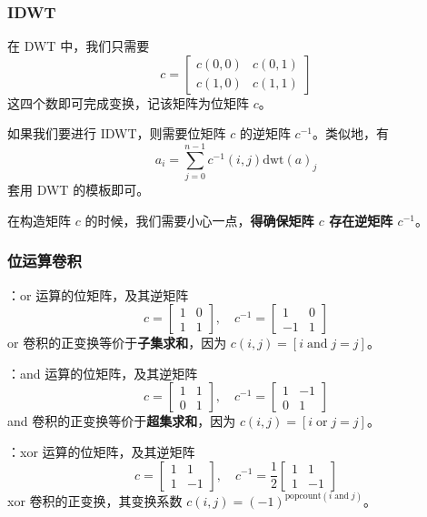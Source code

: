 \subsubsection{IDWT}

在 DWT 中，我们只需要
\[
c = \begin{bmatrix}
c(0, 0) & c(0, 1) \\
c(1, 0) & c(1, 1)
\end{bmatrix}
\]
这四个数即可完成变换，记该矩阵为位矩阵 $c$。

如果我们要进行 IDWT，则需要位矩阵 $c$ 的逆矩阵 $c^{-1}$。类似地，有
\[
a_i = \sum_{j = 0}^{n - 1} c^{-1}(i, j)\mathrm{dwt}(a)_j
\]
套用 DWT 的模板即可。

在构造矩阵 $c$ 的时候，我们需要小心一点，\textbf{得确保矩阵 $c$ 存在逆矩阵 $c^{-1}$}。

\subsubsection{位运算卷积}

：or 运算的位矩阵，及其逆矩阵
\[
c = \begin{bmatrix}
1 & 0 \\
1 & 1
\end{bmatrix}, \quad c^{-1} = \begin{bmatrix}
1 & 0 \\
-1 & 1
\end{bmatrix}
\]
or 卷积的正变换等价于\textbf{子集求和}，因为 $c(i, j) = [i \operatorname{and} j = j]$。

：and 运算的位矩阵，及其逆矩阵
\[
c = \begin{bmatrix}
1 & 1 \\
0 & 1
\end{bmatrix}, \quad c^{-1} = \begin{bmatrix}
1 & -1 \\
0 & 1
\end{bmatrix}
\]
and 卷积的正变换等价于\textbf{超集求和}，因为 $c(i, j) = [i \operatorname{or} j = j]$。

：xor 运算的位矩阵，及其逆矩阵
\[
c = \begin{bmatrix}
1 & 1 \\
1 & -1
\end{bmatrix}, \quad c^{-1} = \frac{1}{2}\begin{bmatrix}
1 & 1 \\
1 & -1
\end{bmatrix}
\]
xor 卷积的正变换，其变换系数 $c(i, j) = (-1)^{\mathrm{popcount}(i \operatorname{and} j)}$。

